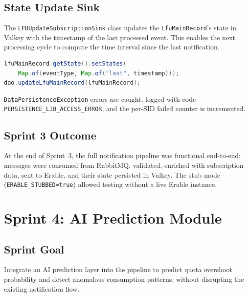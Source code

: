 \subsection{State Update Sink}

The \texttt{LFUUpdateSubscriptionSink} class updates the \texttt{LfuMainRecord}'s state in Valkey with the timestamp of the last processed event. This enables the next processing cycle to compute the time interval since the last notification.

\begin{lstlisting}[language=Java, caption={State update in Valkey}]
lfuMainRecord.getState().setStates(
    Map.of(eventType, Map.of("last", timestamp)));
dao.updateLfuMainRecord(lfuMainRecord);
\end{lstlisting}

\texttt{DataPersistenceException} errors are caught, logged with code \texttt{PERSISTENCE\_LIB\_ACCESS\_ERROR}, and the per-SID failed counter is incremented.

\subsection{Sprint 3 Outcome}

At the end of Sprint~3, the full notification pipeline was functional end-to-end: messages were consumed from RabbitMQ, validated, enriched with subscription data, sent to Erable, and their state persisted in Valkey. The stub mode (\texttt{ERABLE\_STUBBED=true}) allowed testing without a live Erable instance.

\section{Sprint 4: AI Prediction Module}
\label{sec:sprint4}

\subsection{Sprint Goal}

Integrate an AI prediction layer into the pipeline to predict quota overshoot probability and detect anomalous consumption patterns, without disrupting the existing notification flow.

